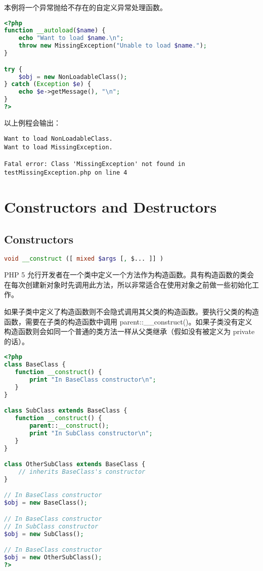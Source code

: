 本例将一个异常抛给不存在的自定义异常处理函数。

\begin{lstlisting}[language=PHP]
<?php
function __autoload($name) {
    echo "Want to load $name.\n";
    throw new MissingException("Unable to load $name.");
}

try {
    $obj = new NonLoadableClass();
} catch (Exception $e) {
    echo $e->getMessage(), "\n";
}
?>
\end{lstlisting}

以上例程会输出：

\begin{verbatim}
Want to load NonLoadableClass.
Want to load MissingException.

Fatal error: Class 'MissingException' not found in testMissingException.php on line 4
\end{verbatim}

\chapter{Constructors and Destructors}


\section{Constructors}


\begin{lstlisting}[language=PHP]
void __construct ([ mixed $args [, $... ]] )
\end{lstlisting}

PHP 5 允行开发者在一个类中定义一个方法作为构造函数。具有构造函数的类会在每次创建新对象时先调用此方法，所以非常适合在使用对象之前做一些初始化工作。

如果子类中定义了构造函数则不会隐式调用其父类的构造函数。要执行父类的构造函数，需要在子类的构造函数中调用 parent::\_\_construct()。如果子类没有定义构造函数则会如同一个普通的类方法一样从父类继承（假如没有被定义为 private 的话）。


\begin{lstlisting}[language=PHP]
<?php
class BaseClass {
   function __construct() {
       print "In BaseClass constructor\n";
   }
}

class SubClass extends BaseClass {
   function __construct() {
       parent::__construct();
       print "In SubClass constructor\n";
   }
}

class OtherSubClass extends BaseClass {
    // inherits BaseClass's constructor
}

// In BaseClass constructor
$obj = new BaseClass();

// In BaseClass constructor
// In SubClass constructor
$obj = new SubClass();

// In BaseClass constructor
$obj = new OtherSubClass();
?>
\end{lstlisting}


